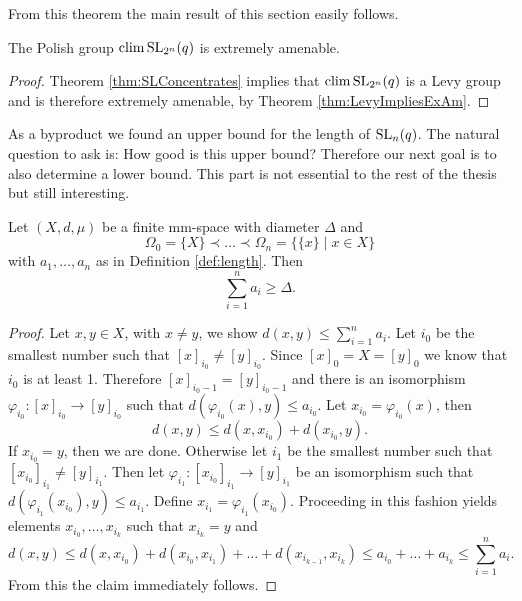 From this theorem the main result of this section easily follows.

\begin{corollary}
The Polish group $\operatorname{clim} \operatorname{SL}_{2^n}(q)$ is extremely amenable.
\end{corollary}
\begin{proof}
Theorem \ref{thm:SLConcentrates} implies that $\operatorname{clim} \operatorname{SL}_{2^n}(q)$ is a Levy group and is therefore extremely amenable, by Theorem \ref{thm:LevyImpliesExAm}.
\end{proof}

As a byproduct we found an upper bound for the length of $\operatorname{SL}_n(q)$. The natural question to ask is: How good is this upper bound? Therefore our next goal is to also determine a lower bound. This part is not essential to the rest of the thesis but still interesting.

\begin{lemma}\label{lem:diamLen}
Let $(X,d,\mu)$ be a finite mm-space with diameter $\Delta$ and %
\[\Omega_0=\{X\}\prec\dots\prec\Omega_n=\{\{x\}\mid x\in X\}\]
with $a_1,\dots,a_n$ as in Definition \ref{def:length}. Then 
\[\sum_{i=1}^{n}a_i\geq \Delta.\]
\end{lemma}
\begin{proof}
Let $x,y\in X$, with $x\neq y$, we show $d(x,y)\leq\sum_{i=1}^{n}a_i$. Let $i_0$ be the smallest number such that $[x]_{i_0}\neq [y]_{i_0}$. Since $[x]_0=X=[y]_0$ we know that $i_0$ is at least 1. Therefore $[x]_{i_0-1}=[y]_{i_0-1}$ and there is an isomorphism $\varphi_{i_0}\colon[x]_{i_0}\to[y]_{i_0}$ such that $d(\varphi_{i_0}(x),y)\leq a_{i_0}$. %
Let $x_{i_0}=\varphi_{i_0}(x)$, then 
\[d(x,y)\leq d(x,x_{i_0})+d(x_{i_0},y).\]
If $x_{i_0}=y$, then we are done. Otherwise let $i_1$ be the smallest number such that $[x_{i_0}]_{i_1}\neq [y]_{i_1}$. Then let $\varphi_{i_1}\colon[x_{i_0}]_{i_1}\to[y]_{i_1}$ be an isomorphism such that $d(\varphi_{i_1}(x_{i_0}),y)\leq a_{i_1}$. Define $x_{i_1}=\varphi_{i_1}(x_{i_0})$. Proceeding in this fashion yields elements $x_{i_0},\dots,x_{i_k}$ such that $x_{i_k}=y$ and
\[d(x,y)\leq d(x,x_{i_0})+d(x_{i_0},x_{i_1})+\dots+d(x_{i_{k-1}},x_{i_k})\leq a_{i_0}+\dots +a_{i_k}\leq\sum_{i=1}^{n}a_i.\]
From this the claim immediately follows.
\end{proof}


